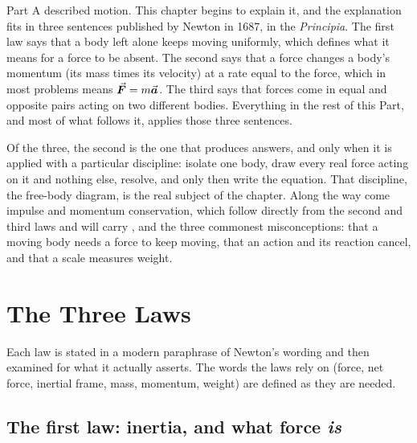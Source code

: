 

Part A described motion. This chapter begins to explain it, and the explanation fits in three
sentences published by Newton in 1687, in the \emph{Principia}. The first law says that a body left alone keeps moving uniformly,
which defines what it means for a force to be absent. The second says that a force changes a body's
momentum (its mass times its velocity) at a rate equal to the force, which in most problems means
$\vec{\bm{F}}=m\vec{\bm{a}}$. The third says that forces come in equal and opposite pairs acting on two different bodies.
Everything in the rest of this Part, and most of what follows it, applies those three sentences.

Of the three, the second is the one that produces answers, and only when it is applied with a particular
discipline: isolate one body, draw every real force acting on it and nothing else, resolve, and only
then write the equation. That discipline, the free-body diagram, is the real subject of the chapter.
Along the way come impulse and momentum conservation, which follow directly from the second and third
laws and will carry , and the three commonest misconceptions: that a moving body
needs a force to keep moving, that an action and its reaction cancel, and that a scale measures weight.

\section{The Three Laws}

Each law is stated in a modern paraphrase of Newton's wording and then examined for what it actually
asserts. The words the laws rely on (force, net force, inertial frame, mass, momentum, weight) are
defined as they are needed.

\subsection{The first law: inertia, and what force \emph{is}}

